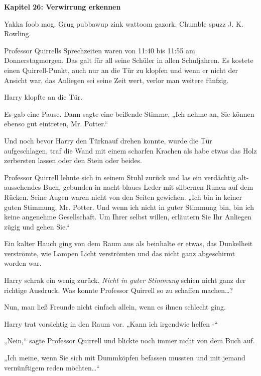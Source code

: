 

\hypertarget{verwirrung-erkennen}{%

\textbf{Kapitel 26: Verwirrung erkennen}

Yakka foob mog. Grug pubbawup zink wattoom gazork. Chumble spuzz J. K. Rowling.

\later

Professor Quirrells Sprechzeiten waren von 11:40 bis 11:55 am Donnerstagmorgen. Das galt für all seine Schüler in allen Schuljahren. Es kostete einen Quirrell-Punkt, auch nur an die Tür zu klopfen und wenn er nicht der Ansicht war, das Anliegen sei seine Zeit wert, verlor man weitere fünfzig.

Harry klopfte an die Tür.

Es gab eine Pause. Dann sagte eine beißende Stimme, „Ich nehme an, Sie können ebenso gut eintreten, Mr. Potter.“

Und noch bevor Harry den Türknauf drehen konnte, wurde die Tür aufgeschlagen, traf die Wand mit einem scharfen Krachen als habe etwas das Holz zerbersten lassen oder den Stein oder beides.

Professor Quirrell lehnte sich in seinem Stuhl zurück und las ein verdächtig alt-aussehendes Buch, gebunden in nacht-blaues Leder mit silbernen Runen auf dem Rücken. Seine Augen waren nicht von den Seiten gewichen. „Ich bin in keiner guten Stimmung, Mr. Potter. Und wenn ich nicht in guter Stimmung bin, bin ich keine angenehme Gesellschaft. Um Ihrer selbst willen, erläutern Sie Ihr Anliegen zügig und gehen Sie.“

Ein kalter Hauch ging von dem Raum aus als beinhalte er etwas, das Dunkelheit verströmte, wie Lampen Licht verströmten und das nicht ganz abgeschirmt worden war.

Harry schrak ein wenig zurück. \emph{Nicht in guter Stimmung} schien nicht ganz der richtige Ausdruck. Was konnte Professor Quirrell so zu schaffen machen…?

Nun, man ließ Freunde nicht einfach allein, wenn es ihnen schlecht ging.

Harry trat vorsichtig in den Raum vor. „Kann ich irgendwie helfen -“

„Nein,“ sagte Professor Quirrell und blickte noch immer nicht von dem Buch auf.

„Ich meine, wenn Sie sich mit Dummköpfen befassen mussten und mit jemand vernünftigem reden möchten…“

}
